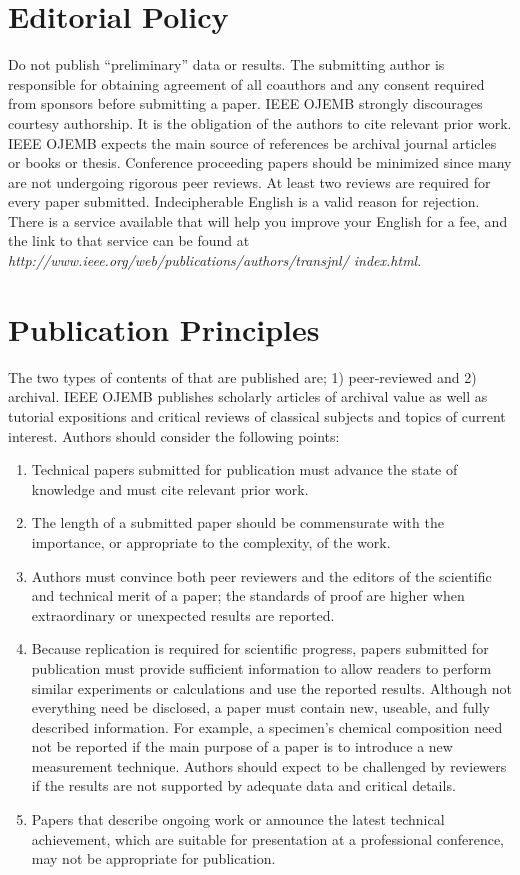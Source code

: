 \documentclass[journal]{IEEEtran}
\begin{document}
\section{Editorial Policy}
{
Do not publish “preliminary” data or results. The submitting author is responsible for obtaining agreement of all coauthors and any consent required from sponsors before submitting a paper. IEEE OJEMB strongly discourages courtesy authorship. It is the obligation of the authors to cite relevant prior work. IEEE OJEMB expects the main source of references be archival journal articles or books or thesis. Conference proceeding papers should be minimized since many are not undergoing rigorous peer reviews. 
At least two reviews are required for every paper submitted. Indecipherable English is a valid reason for rejection. There is a service available that will help you improve your English for a fee, and the link to that service can be found at \textit{http://www.ieee.org/web/publications/authors/transjnl/ index.html}. 
}

\section{Publication Principles}
{
	The two types of contents of that are published are; 1) peer-reviewed and 2) archival. IEEE OJEMB publishes scholarly articles of archival value as well as tutorial expositions and critical reviews of classical subjects and topics of current interest. 
	Authors should consider the following points:
	\begin{enumerate}
		\item Technical papers submitted for publication must advance the state of knowledge and must cite relevant prior work. 
		\item The length of a submitted paper should be commensurate with the importance, or appropriate to the complexity, of the work. 
		\item Authors must convince both peer reviewers and the editors of the scientific and technical merit of a paper; the standards of proof are higher when extraordinary or unexpected results are reported. 
		\item Because replication is required for scientific progress, papers submitted for publication must provide sufficient information to allow readers to perform similar experiments or calculations and use the reported results. Although not everything need be disclosed, a paper must contain new, useable, and fully described information. For example, a specimen’s chemical composition need not be reported if the main purpose of a paper is to introduce a new measurement technique. Authors should expect to be challenged by reviewers if the results are not supported by adequate data and critical details.
		\item Papers that describe ongoing work or announce the latest technical achievement, which are suitable for presentation at a professional conference, may not be appropriate for publication.
	\end{enumerate}
	
	
}


\end{document}
